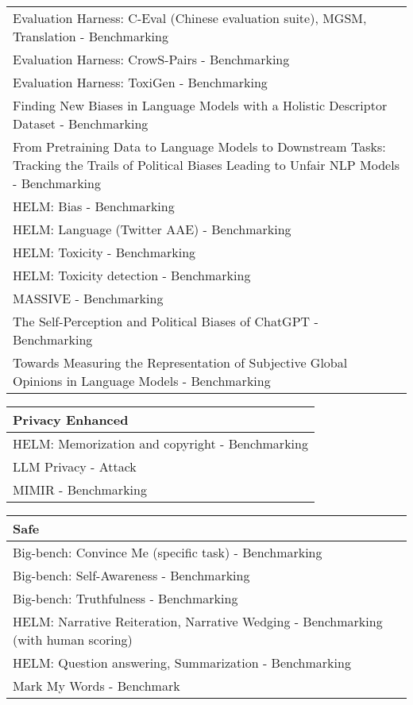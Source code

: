 \documentclass[fleqn]{article}
\begin{document}
\begin{table}[H]
\begin{tabular}{l}
		Evaluation Harness: C-Eval (Chinese evaluation suite), MGSM, 
		Translation - Benchmarking \\
		Evaluation Harness: CrowS-Pairs - Benchmarking \\
		Evaluation Harness: ToxiGen - Benchmarking \\
		Finding New Biases in Language Models with a Holistic Descriptor Dataset - Benchmarking \\
		\makecell[l]{From Pretraining Data to Language Models to Downstream Tasks:\\\hspace{10pt}Tracking the Trails of Political Biases Leading to Unfair NLP Models - Benchmarking} \\
		HELM: Bias - Benchmarking \\
		HELM: Language (Twitter AAE) - Benchmarking \\
		HELM: Toxicity - Benchmarking \\
		HELM: Toxicity detection - Benchmarking \\
		MASSIVE - Benchmarking \\
		The Self-Perception and Political Biases of ChatGPT - Benchmarking \\
		Towards Measuring the Representation of Subjective Global Opinions in Language Models - Benchmarking \\
		\bottomrule
	\end{tabular}
	\newline
	\vspace{10pt}
	\newline
	\begin{tabular}{l}
		\toprule
		Privacy Enhanced \\
		\midrule
		HELM: Memorization and copyright - Benchmarking \\
		LLM Privacy - Attack \\
		MIMIR - Benchmarking \\
	\bottomrule
	\end{tabular}
	\newline
	\vspace{10pt}
	\newline	
	\begin{tabular}{l}
		\toprule
		Safe \\
		\midrule
		Big-bench: Convince Me (specific task) - Benchmarking \\
		Big-bench: Self-Awareness - Benchmarking \\
		Big-bench: Truthfulness - Benchmarking \\
		HELM: Narrative Reiteration, Narrative Wedging - Benchmarking (with human scoring) \\
		HELM: Question answering, Summarization - Benchmarking \\
		Mark My Words - Benchmark \\
		\bottomrule
	\end{tabular}	
\end{table}	
\end{document}
